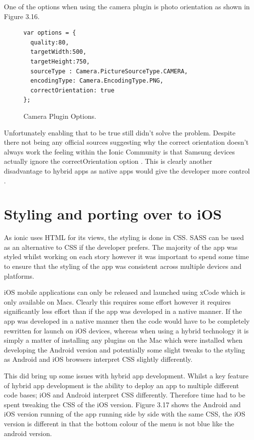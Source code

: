 One of the options when using the camera plugin is photo orientation as shown in Figure 3.16. 
\begin{center}
\begin{figure}[H]
\begin{center}
\begin{verbatim}
var options = {
  quality:80,
  targetWidth:500,
  targetHeight:750,
  sourceType : Camera.PictureSourceType.CAMERA,
  encodingType: Camera.EncodingType.PNG,
  correctOrientation: true
};
\end{verbatim}
\end{center}
\caption{Camera Plugin Options.}
\end{figure}
\end{center}
Unfortunately enabling that to be true still didn't solve the problem. Despite there not being any official sources suggesting why the correct orientation doesn't always work the feeling within the Ionic Community is that Samsung devices actually ignore the correctOrientation option \cite{ioniccom1}. This is clearly another disadvantage to hybrid apps as native apps would give the developer more control \cite{androidcamera}.
\section{Styling and porting over to iOS}
As ionic uses HTML for its views, the styling is done in CSS. SASS can be used as an alternative to CSS if the developer prefers. The majority of the app was styled whilst working on each story however it was important to spend some time to ensure that the styling of the app was consistent across multiple devices and platforms.

iOS mobile applications can only be released and launched using xCode which is only available on Macs. Clearly this requires some effort however it requires significantly less effort than if the app was developed in a native manner. If the app was developed in a native manner then the code would have to be completely rewritten for launch on iOS devices, whereas when using a hybrid technology it is simply a matter of installing any plugins on the Mac which were installed when developing the Android version and potentially some slight tweaks to the styling as Android and iOS browsers interpret CSS slightly differently. 

This did bring up some issues with hybrid app development. Whilst a key feature of hybrid app development is the ability to deploy an app to multiple different code bases; iOS and Android interpret CSS differently. Therefore time had to be spent tweaking the CSS of the iOS version. Figure 3.17 shows the Android and iOS version running of the app running side by side with the same CSS, the iOS version is different in that the bottom colour of the menu is not blue like the android version.

